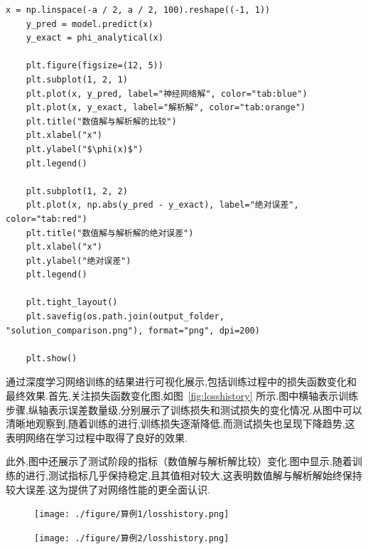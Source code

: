 \documentclass{Sichuan Normal University}
\begin{document}
\begin{lstlisting}[style=python,basicstyle=\footnotesize\fontspec{Courier New},]
    x = np.linspace(-a / 2, a / 2, 100).reshape((-1, 1))
    y_pred = model.predict(x)
    y_exact = phi_analytical(x)
    
    plt.figure(figsize=(12, 5))
    plt.subplot(1, 2, 1)
    plt.plot(x, y_pred, label="神经网络解", color="tab:blue")
    plt.plot(x, y_exact, label="解析解", color="tab:orange")
    plt.title("数值解与解析解的比较")
    plt.xlabel("x")
    plt.ylabel("$\phi(x)$")
    plt.legend()
    
    plt.subplot(1, 2, 2)
    plt.plot(x, np.abs(y_pred - y_exact), label="绝对误差", color="tab:red")
    plt.title("数值解与解析解的绝对误差")
    plt.xlabel("x")
    plt.ylabel("绝对误差")
    plt.legend()
    
    plt.tight_layout()
    plt.savefig(os.path.join(output_folder, "solution_comparison.png"), format="png", dpi=200)
    
    plt.show()
\end{lstlisting}
通过深度学习网络训练的结果进行可视化展示,包括训练过程中的损失函数变化和最终效果.首先,关注损失函数变化图,如图~\ref{fig:losshistory} 所示.图中横轴表示训练步骤,纵轴表示误差数量级,分别展示了训练损失和测试损失的变化情况.从图中可以清晰地观察到,随着训练的进行,训练损失逐渐降低,而测试损失也呈现下降趋势,这表明网络在学习过程中取得了良好的效果.

此外,图中还展示了测试阶段的指标（数值解与解析解比较）变化.图中显示,随着训练的进行,测试指标几乎保持稳定,且其值相对较大,这表明数值解与解析解始终保持较大误差.这为提供了对网络性能的更全面认识.

\begin{figure}[H]
    \centering
    \begin{minipage}[c]{0.48\textwidth}
    \centering
    \texttt{[image: ./figure/算例1/losshistory.png]}
    \end{minipage}
    \hspace{0.02\textwidth}
    \begin{minipage}[c]{0.48\textwidth}
    \centering
    \texttt{[image: ./figure/算例2/losshistory.png]}
    \end{minipage}\\[3mm]
    \begin{minipage}[t]{0.48\textwidth}
    \centering
    \label{fig:losshistory}
    \end{minipage}
    \hspace{0.02\textwidth}
    \begin{minipage}[t]{0.48\textwidth}
    \centering
    \label{fig:losshistory2}
    \end{minipage}
    \end{figure}
\end{document}
